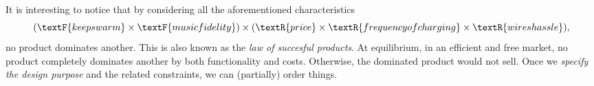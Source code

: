 It is interesting to notice that by considering all the aforementioned characteristics
\begin{equation*}
  (\textF{keeps warm}\times \textF{music fidelity})\times (\textR{price}\times \textR{frequency of charging}\times \textR{wires hassle}),
\end{equation*}
no product dominates another. This is also known as the \emph{law of succesful products}.
At equilibrium, in an efficient and free market, no product completely dominates another by both functionality and costs.
Otherwise, the dominated product would not sell.
Once we \emph{specify the design purpose} and the related constraints, we can (partially) order things.

